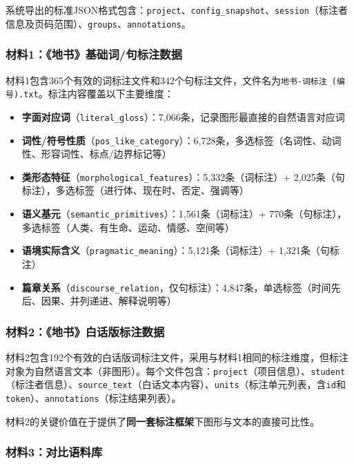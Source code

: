 \documentclass[a4paper,12pt]{article}
\begin{document}
系统导出的标准JSON格式包含：\texttt{project}、\texttt{config\_snapshot}、\texttt{session}（标注者信息及页码范围）、\texttt{groups}、\texttt{annotations}。

\subsubsection{材料1：《地书》基础词/句标注数据}

材料1包含365个有效的词标注文件和342个句标注文件，文件名为\texttt{地书-词标注 (编号).txt}。标注内容覆盖以下主要维度：
\begin{itemize}
    \item \textbf{字面对应词}（\texttt{literal\_gloss}）：7,066条，记录图形最直接的自然语言对应词
    \item \textbf{词性/符号性质}（\texttt{pos\_like\_category}）：6,728条，多选标签（名词性、动词性、形容词性、标点/边界标记等）
    \item \textbf{类形态特征}（\texttt{morphological\_features}）：5,332条（词标注）+ 2,025条（句标注），多选标签（进行体、现在时、否定、强调等）
    \item \textbf{语义基元}（\texttt{semantic\_primitives}）：1,561条（词标注）+ 770条（句标注），多选标签（人类、有生命、运动、情感、空间等）
    \item \textbf{语境实际含义}（\texttt{pragmatic\_meaning}）：5,121条（词标注）+ 1,321条（句标注）
    \item \textbf{篇章关系}（\texttt{discourse\_relation}，仅句标注）：4,847条，单选标签（时间先后、因果、并列递进、解释说明等）
\end{itemize}

\subsubsection{材料2：《地书》白话版标注数据}

材料2包含192个有效的白话版词标注文件，采用与材料1相同的标注维度，但标注对象为自然语言文本（非图形）。每个文件包含：\texttt{project}（项目信息）、\texttt{student}（标注者信息）、\texttt{source\_text}（白话文本内容）、\texttt{units}（标注单元列表，含\texttt{id}和\texttt{token}）、\texttt{annotations}（标注结果列表）。

材料2的关键价值在于提供了\textbf{同一套标注框架}下图形与文本的直接可比性。

\subsubsection{材料3：对比语料库}
\end{document}
